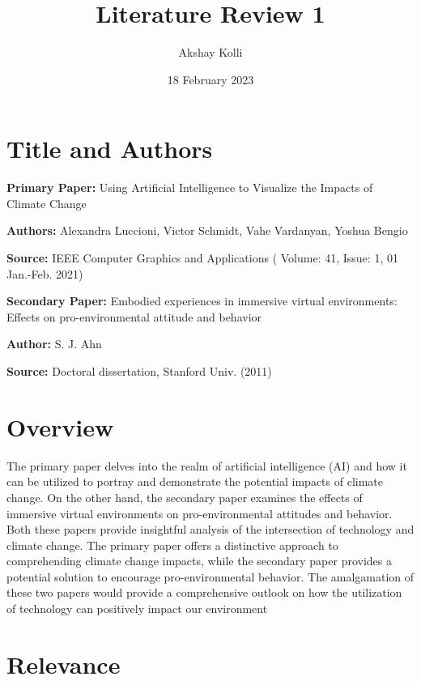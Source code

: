 \documentclass{article}
\title{Literature Review 1}
\author{Akshay Kolli}
\date{18 February 2023}
\begin{document}
\maketitle



\section{Title and Authors}



\textbf{Primary Paper:} Using Artificial Intelligence to Visualize the Impacts of Climate Change

\bigskip
\noindent\textbf{Authors:} Alexandra Luccioni, Victor Schmidt, Vahe Vardanyan, Yoshua Bengio

\bigskip
\noindent\textbf{Source:} IEEE Computer Graphics and Applications ( Volume: 41, Issue: 1, 01 Jan.-Feb. 2021)

\bigskip
\noindent\textbf{Secondary Paper:} Embodied experiences in immersive virtual environments: Effects on pro-environmental attitude and behavior

\bigskip

\noindent\textbf{Author:} S. J. Ahn

\bigskip
\noindent\textbf{Source:} Doctoral dissertation, Stanford Univ. (2011)

\section{Overview}

The primary paper delves into the realm of artificial intelligence (AI) and how it can be utilized to portray and demonstrate the potential impacts of climate change. On the other hand, the secondary paper examines the effects of immersive virtual environments on pro-environmental attitudes and behavior. Both these papers provide insightful analysis of the intersection of technology and climate change. The primary paper offers a distinctive approach to comprehending climate change impacts, while the secondary paper provides a potential solution to encourage pro-environmental behavior. The amalgamation of these two papers would provide a comprehensive outlook on how the utilization of technology can positively impact our environment

\section{Relevance}
\end{document}
